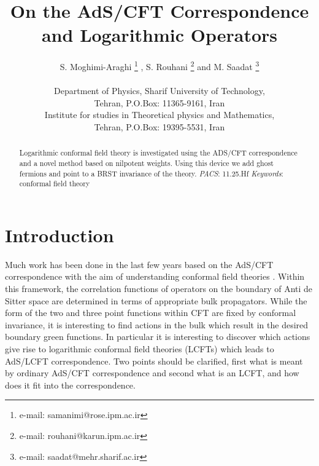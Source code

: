\documentclass[a4paper,11pt]{article}
\begin{document}
\title{On the AdS/CFT Correspondence and Logarithmic Operators}
\author{S. Moghimi-Araghi \footnote{e-mail: samanimi@rose.ipm.ac.ir}
, S. Rouhani \footnote{e-mail: rouhani@karun.ipm.ac.ir} and M. Saadat
\footnote{e-mail: saadat@mehr.sharif.ac.ir}\\ \\ Department of
Physics, Sharif University of Technology,\\ Tehran, P.O.Box:
11365-9161, Iran\\ Institute for studies in Theoretical physics
and Mathematics,\\ Tehran, P.O.Box: 19395-5531, Iran}
\maketitle

\begin{abstract}
Logarithmic conformal field theory is investigated using the ADS/CFT correspondence
and a novel method based on nilpotent weights. Using this device we add
ghost fermions and point to a BRST invariance of the theory. \vspace{5mm}%
\newline
\textit{PACS}: 11.25.Hf \newline \textit{Keywords}: conformal
field theory
\end{abstract}

\section{Introduction}

Much work has been done in the last few years based on the AdS/CFT
correspondence with the aim of understanding conformal field
theories \cite {ADS}. Within this framework, the correlation
functions of operators on the boundary of Anti de Sitter space
are determined in terms of appropriate bulk propagators. While
the form of the two and three point functions within CFT are
fixed by conformal invariance, it is interesting to find actions
in the bulk which result in the desired boundary green functions.
In particular it is interesting to discover which actions give
rise to logarithmic conformal field theories (LCFTs) which leads
to AdS/LCFT correspondence. Two points should be clarified, first
what is meant by ordinary AdS/CFT correspondence and second what
is an LCFT, and how does it fit into the correspondence.
\end{document}

